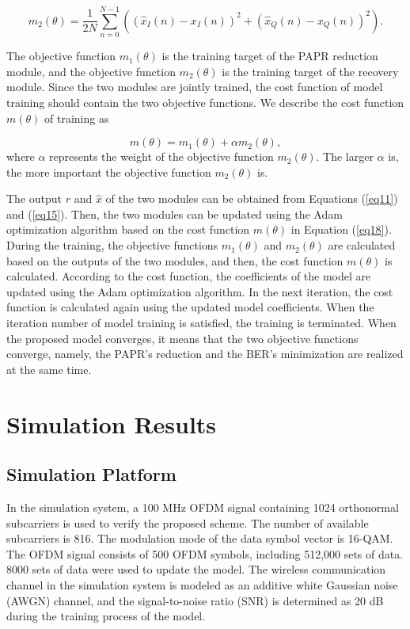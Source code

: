 \documentclass[journal]{IEEEtran}
\begin{document}
\begin{equation}
m_2(\theta) = \frac{1}{2N} \sum_{n=0}^{N-1} ( (\hat{x}_I(n) - x_I(n))^2 + (\hat{x}_Q(n) - x_Q(n))^2 ).
\label{eq17}
\end{equation}

The objective function $m_1(\theta)$ is the training target of the PAPR reduction module, and the objective function $m_2(\theta)$ is the training target of the recovery module. Since the two modules are jointly trained, the cost function of model training should contain the two objective functions. We describe the cost function $m(\theta)$ of training as

\begin{equation}
m(\theta) = m_1(\theta) + \alpha m_2(\theta),
\label{eq18}
\end{equation}
where $\alpha$ represents the weight of the objective function $m_2(\theta)$. The larger $\alpha$ is, the more important the objective function $m_2(\theta)$ is.

The output $r$ and $\hat{x}$ of the two modules can be obtained from Equations (\ref{eq11}) and (\ref{eq15}). Then, the two modules can be updated using the Adam optimization algorithm \cite{b23} based on the cost function $m(\theta)$ in Equation (\ref{eq18}). During the training, the objective functions $m_1(\theta)$ and $m_2(\theta)$ are calculated based on the outputs of the two modules, and then, the cost function $m(\theta)$ is calculated. According to the cost function, the coefficients of the model are updated using the Adam optimization algorithm. In the next iteration, the cost function is calculated again using the updated model coefficients. When the iteration number of model training is satisfied, the training is terminated. When the proposed model converges, it means that the two objective functions converge, namely, the PAPR's reduction and the BER's minimization are realized at the same time.

\section{Simulation Results}

\subsection{Simulation Platform}
In the simulation system, a 100 MHz OFDM signal containing 1024 orthonormal subcarriers is used to verify the proposed scheme. The number of available subcarriers is 816. The modulation mode of the data symbol vector is 16-QAM. The OFDM signal consists of 500 OFDM symbols, including 512,000 sets of data. 8000 sets of data were used to update the model. The wireless communication channel in the simulation system is modeled as an additive white Gaussian noise (AWGN) channel, and the signal-to-noise ratio (SNR) is determined as 20 dB during the training process of the model.
\end{document}
